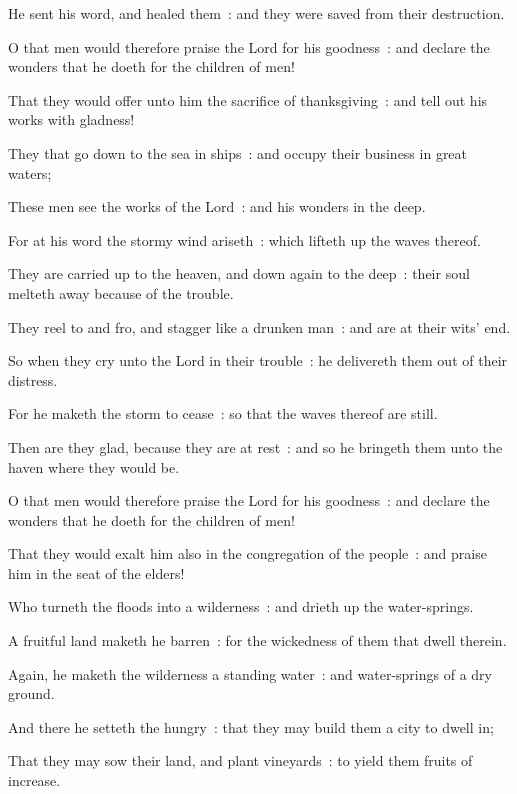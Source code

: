 He sent his word, and healed them~: and they were saved from their destruction.\par
{}O that men would therefore praise the Lord for his goodness~: and declare the wonders that he doeth for the children of men!\par
{}That they would offer unto him the sacrifice of thanksgiving~: and tell out his works with gladness!\par
{}They that go down to the sea in ships~: and occupy their business in great waters;\par
{}These men see the works of the Lord~: and his wonders in the deep.\par
{}For at his word the stormy wind ariseth~: which lifteth up the waves thereof.\par
{}They are carried up to the heaven, and down again to the deep~: their soul melteth away because of the trouble.\par
{}They reel to and fro, and stagger like a drunken man~: and are at their wits' end.\par
{}So when they cry unto the Lord in their trouble~: he delivereth them out of their distress.\par
{}For he maketh the storm to cease~: so that the waves thereof are still.\par
{}Then are they glad, because they are at rest~: and so he bringeth them unto the haven where they would be.\par
{}O that men would therefore praise the Lord for his goodness~: and declare the wonders that he doeth for the children of men!\par
{}That they would exalt him also in the congregation of the people~: and praise him in the seat of the elders!\par
{}Who turneth the floods into a wilderness~: and drieth up the water-springs.\par
{}A fruitful land maketh he barren~: for the wickedness of them that dwell therein.\par
{}Again, he maketh the wilderness a standing water~: and water-springs of a dry ground.\par
{}And there he setteth the hungry~: that they may build them a city to dwell in;\par
{}That they may sow their land, and plant vineyards~: to yield them fruits of increase.\par

